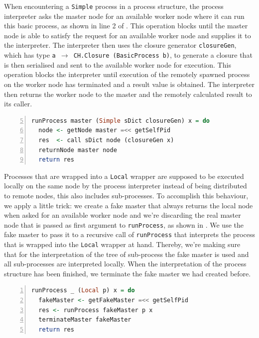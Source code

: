 When encountering a \texttt{Simple} process in a process structure, the process interpreter asks the master node for an available worker node where it can run this basic process, as shown in line 2 of . This operation blocks until the master node is able to satisfy the request for an available worker node and supplies it to the interpreter. The interpreter then uses the closure generator \texttt{closureGen}, which has type \texttt{a $\to$ CH.Closure (BasicProcess b)}, to generate a closure that is then serialised and sent to the available worker node for execution. This operation blocks the interpreter until execution of the remotely spawned process on the worker node has terminated and a result value is obtained. The interpreter then returns the worker node to the master and the remotely calculated result to its caller.
\begin{lstlisting}[language=Haskell,caption=Implementation of the interpreter for \texttt{Simple} processes.,label=lst:runprocess_simple,numbers=left,frame=bt,firstnumber=5]
runProcess master (Simple sDict closureGen) x = do
  node <- getNode master =<< getSelfPid
  res  <- call sDict node (closureGen x)
  returnNode master node
  return res
\end{lstlisting}

Processes that are wrapped into a \texttt{Local} wrapper are supposed to be executed locally on the same node by the process interpreter instead of being distributed to remote nodes, this also includes sub-processes. To accomplish this behaviour, we apply a little trick: we create a fake master that always returns the local node when asked for an available worker node and we're discarding the real master node that is passed as first argument to \texttt{runProcess}, as shown in . We use the fake master to pass it to a recursive call of \texttt{runProcess} that interprets the process that is wrapped into the \texttt{Local} wrapper at hand. Thereby, we're making sure that for the interpretation of the tree of sub-process the fake master is used and all sub-processes are interpreted locally. When the interpretation of the process structure has been finished, we terminate the fake master we had created before.
\begin{lstlisting}[language=Haskell,caption=Implementation of the interpreter for \texttt{Local} processes.,label=lst:runprocess_local,numbers=left,frame=bt]
runProcess _ (Local p) x = do
  fakeMaster <- getFakeMaster =<< getSelfPid
  res <- runProcess fakeMaster p x
  terminateMaster fakeMaster
  return res
\end{lstlisting}

